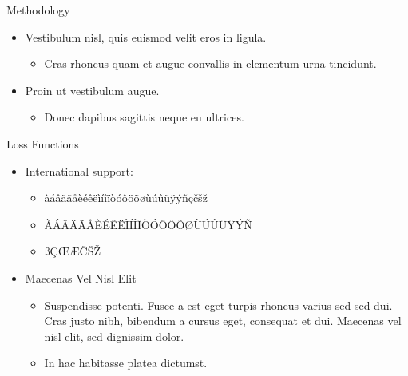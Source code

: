 \documentclass{beamer} %
\def\E{\mathbb{E}} %
\newcommand{\x}{\textbf{v}}
\begin{document}
\begin{frame}[t]
\begin{columns}[t]
\begin{column}{0.465\textwidth}
\begin{block}{Methodology}


	\begin{itemize}

		\item Vestibulum nisl, quis euismod velit eros in ligula.
		\begin{itemize}
			\item Cras rhoncus quam et augue convallis in elementum urna tincidunt.
		\end{itemize}
		\item Proin ut vestibulum augue.
		\begin{itemize}
			\item Donec dapibus sagittis neque eu ultrices.
		\end{itemize}

	\end{itemize}

	

	
	\bigskip %
	
\end{block}


\begin{block}{Loss Functions}	
	\begin{itemize}
		\item International support:
		\begin{itemize}
			\item àáâäãåèéêëìíîïòóôöõøùúûüÿýñçčšž
			\item ÀÁÂÄÃÅÈÉÊËÌÍÎÏÒÓÔÖÕØÙÚÛÜŸÝÑ
			\item ßÇŒÆČŠŽ
		\end{itemize}
		\item Maecenas Vel Nisl Elit
		\begin{itemize}
			\item Suspendisse potenti. Fusce a est eget turpis rhoncus varius sed sed dui. Cras justo nibh, bibendum a cursus eget, consequat et dui. Maecenas vel nisl elit, sed dignissim dolor. 
			\item In hac habitasse platea dictumst.
		\end{itemize}
		

\end{itemize}
\end{block}
\end{column}
\end{columns}
\end{frame}
\end{document}
